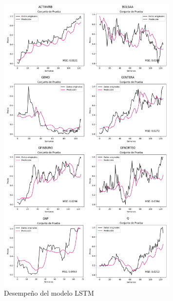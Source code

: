 \begin{figure}[H]
    \centering
    \includegraphics[width=0.8\textwidth]{Figuras/analisis/LSTM.png}
    \caption{Desempeño del modelo LSTM} 
    \label{fig:desempenio_LSTM}
\end{figure}

